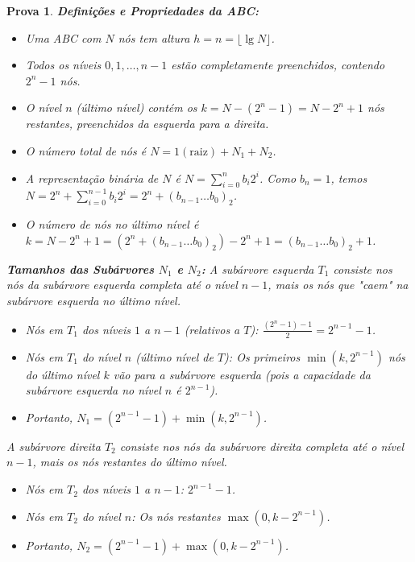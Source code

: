 \documentclass[11pt,reqno,a4paper]{amsart}
\theoremstyle{prova_style}
\newtheorem*{prova}{Prova} %
\DeclareMathOperator{\lgop}{lg}
\newcommand{\lgfn}[1]{\lgop #1}
\begin{document}
\begin{prova}
\textbf{Definições e Propriedades da ABC:}
\begin{itemize}
    \item Uma ABC com $N$ nós tem altura $h = n = \lfloor \lgfn N \rfloor$.
    \item Todos os níveis $0, 1, \dots, n-1$ estão completamente preenchidos, contendo $2^n - 1$ nós.
    \item O nível $n$ (último nível) contém os $k = N - (2^n - 1) = N - 2^n + 1$ nós restantes, preenchidos da esquerda para a direita.
    \item O número total de nós é $N = 1 (\text{raiz}) + N_1 + N_2$.
    \item A representação binária de $N$ é $N = \sum_{i=0}^{n} b_i 2^i$. Como $b_n=1$, temos $N = 2^n + \sum_{i=0}^{n-1} b_i 2^i = 2^n + (b_{n-1} \dots b_0)_2$.
    \item O número de nós no último nível é $k = N - 2^n + 1 = (2^n + (b_{n-1} \dots b_0)_2) - 2^n + 1 = (b_{n-1} \dots b_0)_2 + 1$.
\end{itemize}

\textbf{Tamanhos das Subárvores $N_1$ e $N_2$:}
A subárvore esquerda $T_1$ consiste nos nós da subárvore esquerda completa até o nível $n-1$, mais os nós que "caem" na subárvore esquerda no último nível.
\begin{itemize}
    \item Nós em $T_1$ dos níveis $1$ a $n-1$ (relativos a $T$): $\frac{(2^n - 1) - 1}{2} = 2^{n-1} - 1$.
    \item Nós em $T_1$ do nível $n$ (último nível de $T$): Os primeiros $\min(k, 2^{n-1})$ nós do último nível $k$ vão para a subárvore esquerda (pois a capacidade da subárvore esquerda no nível $n$ é $2^{n-1}$).
    \item Portanto, $N_1 = (2^{n-1} - 1) + \min(k, 2^{n-1})$.
\end{itemize}
A subárvore direita $T_2$ consiste nos nós da subárvore direita completa até o nível $n-1$, mais os nós restantes do último nível.
\begin{itemize}
    \item Nós em $T_2$ dos níveis $1$ a $n-1$: $2^{n-1} - 1$.
    \item Nós em $T_2$ do nível $n$: Os nós restantes $\max(0, k - 2^{n-1})$.
    \item Portanto, $N_2 = (2^{n-1} - 1) + \max(0, k - 2^{n-1})$.
\end{itemize}


\end{prova}
\end{document}
